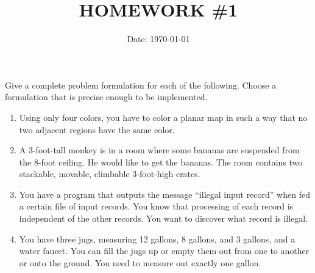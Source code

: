 \documentclass[cn,12pt]{homework}
\title{HOMEWORK \#1} %
\date{Date: \today} %
\institute{ZHEJIANG UNIVERSITY\quad COLLEGE OF INFORMATION SCIENCE AND ELECTRONICS ENGINEERING} %
\begin{document}
\maketitle



\begin{problem}

{\selectfont Give a complete problem formulation for each of the following. Choose a formulation that is precise enough to be implemented.}

\begin{enumerate}[label=\alph*)]
    \item Using only four colors, you have to color a planar map in such a way that no two adjacent regions have the same color.
    \item A 3-foot-tall monkey is in a room where some bananas are suspended from the 8-foot ceiling. He would like to get the bananas. The room contains two stackable, movable, climbable 3-foot-high crates.
    \item You have a program that outputs the message ``illegal input record'' when fed a certain file of input records. You know that processing of each record is independent of the other records. You want to discover what record is illegal.
    \item You have three jugs, measuring 12 gallons, 8 gallons, and 3 gallons, and a water faucet. You can fill the jugs up or empty them out from one to another or onto the ground. You need to measure out exactly one gallon.
\end{enumerate}

\end{problem}
\end{document}
